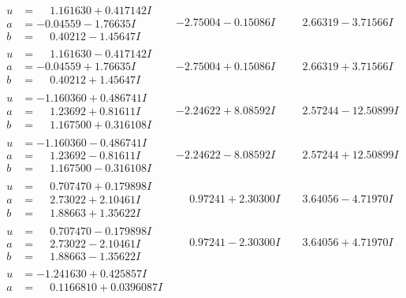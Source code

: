 \documentclass[1p]{elsarticle_modified}
\theoremstyle{definition}
\begin{document}
$$\begin{array}{c|c|c}
\begin{aligned}
u &= \phantom{-}1.161630 + 0.417142 I \\
a &= -0.04559 - 1.76635 I \\
b &= \phantom{-}0.40212 - 1.45647 I\end{aligned}
 & -2.75004 - 0.15086 I & \phantom{-}2.66319 - 3.71566 I \\ \hline\begin{aligned}
u &= \phantom{-}1.161630 - 0.417142 I \\
a &= -0.04559 + 1.76635 I \\
b &= \phantom{-}0.40212 + 1.45647 I\end{aligned}
 & -2.75004 + 0.15086 I & \phantom{-}2.66319 + 3.71566 I \\ \hline\begin{aligned}
u &= -1.160360 + 0.486741 I \\
a &= \phantom{-}1.23692 + 0.81611 I \\
b &= \phantom{-}1.167500 + 0.316108 I\end{aligned}
 & -2.24622 + 8.08592 I & \phantom{-}2.57244 - 12.50899 I \\ \hline\begin{aligned}
u &= -1.160360 - 0.486741 I \\
a &= \phantom{-}1.23692 - 0.81611 I \\
b &= \phantom{-}1.167500 - 0.316108 I\end{aligned}
 & -2.24622 - 8.08592 I & \phantom{-}2.57244 + 12.50899 I \\ \hline\begin{aligned}
u &= \phantom{-}0.707470 + 0.179898 I \\
a &= \phantom{-}2.73022 + 2.10461 I \\
b &= \phantom{-}1.88663 + 1.35622 I\end{aligned}
 & \phantom{-}0.97241 + 2.30300 I & \phantom{-}3.64056 - 4.71970 I \\ \hline\begin{aligned}
u &= \phantom{-}0.707470 - 0.179898 I \\
a &= \phantom{-}2.73022 - 2.10461 I \\
b &= \phantom{-}1.88663 - 1.35622 I\end{aligned}
 & \phantom{-}0.97241 - 2.30300 I & \phantom{-}3.64056 + 4.71970 I \\ \hline\begin{aligned}
u &= -1.241630 + 0.425857 I \\
a &= \phantom{-}0.1166810 + 0.0396087 I \\

\end{aligned}
\end{array}$$
\end{document}
